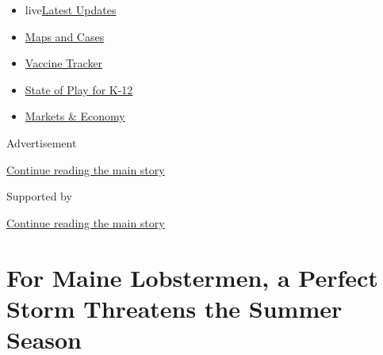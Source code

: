 \begin{itemize}
\tightlist
\item
  live\href{https://www.nytimes3xbfgragh.onion/2020/08/17/world/coronavirus-covid.html?name=styln-coronavirus-national\&region=TOP_BANNER\&variant=undefined\&block=storyline_menu_recirc\&action=click\&pgtype=Article\&impression_id=a487c291-e108-11ea-b959-2b70faf7b631}{Latest
  Updates}
\item
  \href{https://www.nytimes3xbfgragh.onion/interactive/2020/us/coronavirus-us-cases.html?name=styln-coronavirus-national\&region=TOP_BANNER\&variant=undefined\&block=storyline_menu_recirc\&action=click\&pgtype=Article\&impression_id=a487c292-e108-11ea-b959-2b70faf7b631}{Maps
  and Cases}
\item
  \href{https://www.nytimes3xbfgragh.onion/interactive/2020/science/coronavirus-vaccine-tracker.html?name=styln-coronavirus-national\&region=TOP_BANNER\&variant=undefined\&block=storyline_menu_recirc\&action=click\&pgtype=Article\&impression_id=a487c293-e108-11ea-b959-2b70faf7b631}{Vaccine
  Tracker}
\item
  \href{https://www.nytimes3xbfgragh.onion/2020/08/17/us/k-12-schools-reopening.html?name=styln-coronavirus-national\&region=TOP_BANNER\&variant=undefined\&block=storyline_menu_recirc\&action=click\&pgtype=Article\&impression_id=a487c294-e108-11ea-b959-2b70faf7b631}{State
  of Play for K-12}
\item
  \href{https://www.nytimes3xbfgragh.onion/live/2020/08/17/business/stock-market-today-coronavirus?name=styln-coronavirus-national\&region=TOP_BANNER\&variant=undefined\&block=storyline_menu_recirc\&action=click\&pgtype=Article\&impression_id=a487c295-e108-11ea-b959-2b70faf7b631}{Markets
  \& Economy}
\end{itemize}

Advertisement

\protect\hyperlink{after-top}{Continue reading the main story}

Supported by

\protect\hyperlink{after-sponsor}{Continue reading the main story}

\hypertarget{for-maine-lobstermen-a-perfect-storm-threatens-the-summer-season}{%
\section{For Maine Lobstermen, a Perfect Storm Threatens the Summer
Season}\label{for-maine-lobstermen-a-perfect-storm-threatens-the-summer-season}}

